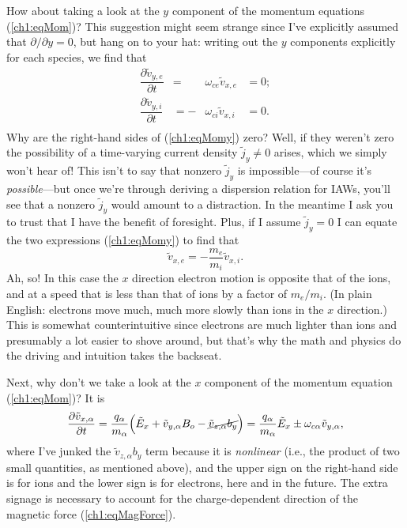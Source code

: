 How about taking a look at the $y$ component of the momentum equations
(\ref{ch1:eqMom})? This suggestion might seem strange since I've explicitly
assumed that $\partial / \partial y = 0$, but hang on to your hat: writing out
the $y$ components explicitly for each species, we find that
\begin{equation} 
  \begin{alignedat}{2}
    \label{ch1:eqMomy} \dfrac{\partial \tilde v_{y,e}}{\partial t} &=
    &\omega_{ce} \tilde v_{x,e} &= 0; \\
    \dfrac{\partial \tilde v_{y,i}}{\partial t} &=
    - &\omega_{ci} \tilde v_{x,i} &= 0. \\
  \end{alignedat}
\end{equation}
Why are the right-hand sides of (\ref{ch1:eqMomy}) zero?  Well, if they weren't
zero the possibility of a time-varying current density $\tilde j_y \neq 0$
arises, which we simply won't hear of! This isn't to say that nonzero
$\tilde j_y$ is impossible---of course it's \emph{possible}---but once we're
through deriving a dispersion relation for IAWs, you'll see that
a nonzero $\tilde j_y$ would amount to a distraction. In the meantime I ask you
to trust that I have the benefit of foresight. Plus, if I assume
$\tilde j_y = 0$ I can equate the two expressions (\ref{ch1:eqMomy}) to find
that
\begin{equation} 
  \tilde v_{x,e} = - \dfrac{m_e}{m_i} \tilde v_{x,i}.
\end{equation}
Ah, so! In this case the $x$ direction electron motion is opposite that of the
ions, and at a speed that is less than that of ions by a factor of $m_e /
m_i$. (In plain English: electrons move much, much more slowly than ions in the
$x$ direction.) This is somewhat counterintuitive since electrons are much
lighter than ions and presumably a lot easier to shove around, but that's why
the math and physics do the driving and intuition takes the backseat.

Next, why don't we take a look at the $x$ component of the momentum equation
(\ref{ch1:eqMom})? It is
\begin{equation} \label{ch1:eqMomx} \dfrac{\partial \tilde v_{x,\alpha}}{\partial t} =
  \dfrac{q_\alpha}{m_\alpha} \Big ( \tilde E_x + \tilde v_{y,\alpha} B_o - \cancel{\tilde v_{z,\alpha} b_y}
  \Big ) = \dfrac{q_\alpha}{m_\alpha} \tilde E_x \pm \omega_{c \alpha} \tilde v_{y,\alpha},
\end{equation}
where I've junked the $\tilde v_{z,\alpha} b_y$ term because it is \emph{nonlinear}
(i.e., the product of two small quantities, as mentioned above), and the upper
sign on the right-hand side is for ions and the lower sign is for electrons,
here and in the future. The extra signage is necessary to account for the
charge-dependent direction of the magnetic force (\ref{ch1:eqMagForce}).

